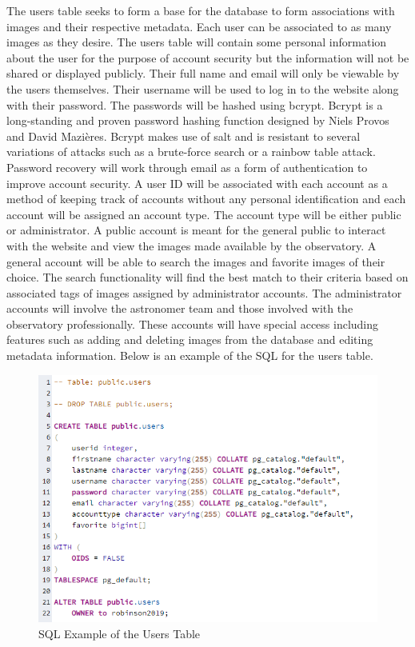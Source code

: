 \documentclass[12pt]{report}
\begin{document}
\begin{enumerate}
The users table seeks to form a base for the database to form associations with images and their respective metadata.  Each user can be associated to as many images as they desire.  The users table will contain some personal information about the user for the purpose of account security but the information will not be shared or displayed publicly.  Their full name and email will only be viewable by the users themselves.  Their username will be used to log in to the website along with their password.  The passwords will be hashed using bcrypt.  Bcrypt is a long-standing and proven password hashing function designed by Niels Provos and David Mazières.  Bcrypt makes use of salt and is resistant to several variations of attacks such as a brute-force search or a rainbow table attack.  Password recovery will work through email as a form of authentication to improve account security.
A user ID will be associated with each account as a method of keeping track of accounts without any personal identification and each account will be assigned an account type.  The account type will be either public or administrator.  A public account is meant for the general public to interact with the website and view the images made available by the observatory.  A general account will be able to search the images and favorite images of their choice.  The search functionality will find the best match to their criteria based on associated tags of images assigned by administrator accounts.  The administrator accounts will involve the astronomer team and those involved with the observatory professionally.  These accounts will have special access including features such as adding and deleting images from the database and editing metadata information.
Below is an example of the SQL for the users table.


\begin{figure}[h]
	\centering
	\includegraphics[width=\linewidth]{database_user_table}
	\caption{SQL Example of the Users Table}
	\label{fig:SQL Users Table}
\end{figure}


\end{enumerate}
\end{document}
